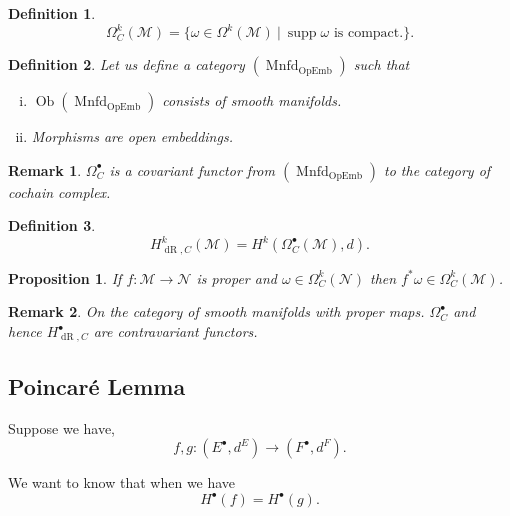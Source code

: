 \documentclass[8pt]{article}
\newtheorem{proposition}{Proposition}[section]
\newtheorem{definition}{Definition}[section]
\newtheorem{remark}{Remark}[section]
\DeclareMathOperator{\supp}{supp}
\DeclareMathOperator{\dR}{dR}
\DeclareMathOperator{\Ob}{Ob}
\DeclareMathOperator{\Mnfd}{Mnfd}
\DeclareMathOperator{\OpEmb}{OpEmb}
\newcommand{\M}[0]{\mathcal{M}}
\newcommand{\maniN}[0]{\mathcal{N}}
\newcommand{\sep}[0]{\:|\:}
\begin{document}
\begin{definition}
  \begin{equation*}
    \Omega_C^k(\M) = \{\omega\in\Omega^k(\M)\sep \supp\omega\text{ is compact.}\}.
  \end{equation*}
\end{definition}

\begin{definition}
  Let us define a category $(\Mnfd_{\OpEmb})$ such that 
  \begin{enumerate}[i).]
    \item $\Ob(\Mnfd_{\OpEmb})$ consists of smooth manifolds.
    \item Morphisms are open embeddings.
  \end{enumerate}
\end{definition}

\begin{remark}
  $\Omega^\bullet_C$ is a covariant functor from $(\Mnfd_{\OpEmb})$ to the category of cochain complex.
\end{remark}

\begin{definition}
  \begin{equation*}
    H^k_{\dR,C}(\M) = H^k(\Omega_C^\bullet(\M),d).
  \end{equation*}
\end{definition}

\begin{proposition}
  If $f:\M\to\maniN$ is proper and $\omega\in\Omega^k_C(\maniN)$ then $f^*\omega\in\Omega_C^k(\M)$.
\end{proposition}

\begin{remark}
  On the category of smooth manifolds with proper maps. $\Omega_C^\bullet$ and hence $H_{\dR,C}^\bullet$ are contravariant functors.
\end{remark}


\subsection{Poincaré Lemma}

Suppose we have,
\begin{equation*}
  f,g:(E^\bullet,d^E)\to(F^\bullet,d^F).
\end{equation*}

We want to know that when we have
\begin{equation*}
  H^\bullet(f) = H^\bullet(g).
\end{equation*}
\end{document}
